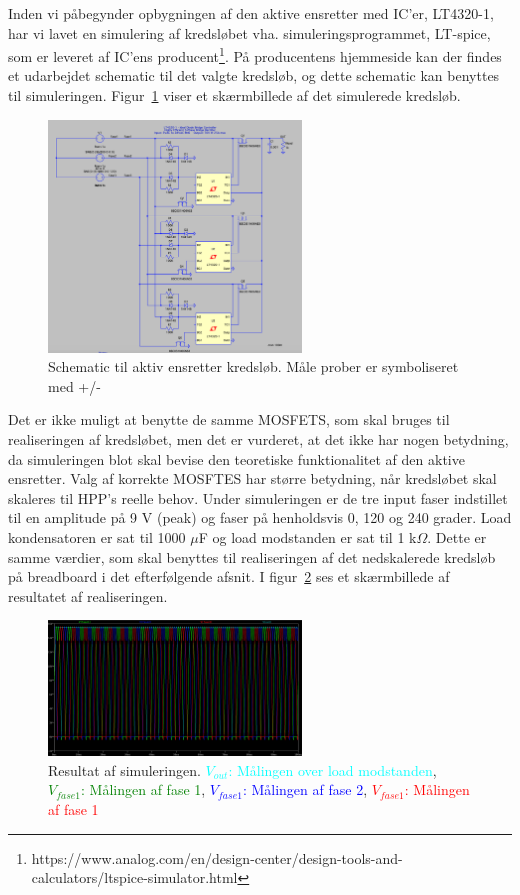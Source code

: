 Inden vi påbegynder opbygningen af den aktive ensretter med IC’er, LT4320-1, har vi lavet en simulering af kredsløbet vha. simuleringsprogrammet, LT-spice, som er leveret af IC’ens producent\footnote{https://www.analog.com/en/design-center/design-tools-and-calculators/ltspice-simulator.html}. På producentens hjemmeside kan der findes et udarbejdet schematic til det valgte kredsløb, og dette schematic kan benyttes til simuleringen. Figur~\ref{fig:schem} viser et skærmbillede af det simulerede kredsløb.

\begin{figure}[h]
  \centering
  \includegraphics[width=0.6\textwidth]{schem.png}
  \caption{Schematic til aktiv ensretter kredsløb. Måle prober er symboliseret med +/-}
  \label{fig:schem}
\end{figure}

Det er ikke muligt at benytte de samme MOSFETS, som skal bruges til realiseringen af kredsløbet, men det er vurderet, at det ikke har nogen betydning, da simuleringen blot skal bevise den teoretiske funktionalitet af den aktive ensretter. Valg af korrekte MOSFTES har større betydning, når kredsløbet skal skaleres til HPP’s reelle behov. 
Under simuleringen er de tre input faser indstillet til en amplitude på 9 V (peak) og faser på henholdsvis 0, 120 og 240 grader. Load kondensatoren er sat til 1000 $\mu$F og load modstanden er sat til 1 k$\Omega$. Dette er samme værdier, som skal benyttes til realiseringen af det nedskalerede kredsløb på breadboard i det efterfølgende afsnit.
\clearpage
I figur~\ref{fig:real1} ses et skærmbillede af resultatet af realiseringen.

\begin{figure}[h]
  \centering
  \includegraphics[width=0.6\textwidth]{real1.png}
  \caption{Resultat af simuleringen. \textcolor{cyan}{$V_{out}$: Målingen over load modstanden}, \textcolor{green}{$V_{fase1}$: Målingen af fase 1}, \textcolor{blue}{$V_{fase1}$: Målingen af fase 2}, \textcolor{red}{$V_{fase1}$: Målingen af fase 1}}
  \label{fig:real1}
\end{figure}

